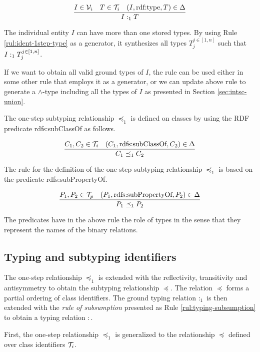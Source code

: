 \documentclass[runningheads]{llncs}
\newcommand{\V}{{\cal V}}
\newcommand{\T}{{\cal T}}
\begin{document}
\begin{equation}
\label{rul:ident-1step-type}
\dfrac{I\in\V_i\quad T\in\T_i\quad (I,\text{rdf:type},T)\in\D}
      {I :_1 T}
\end{equation}

The individual entity $I$ can have more than one stored types. By
using Rule \ref{rul:ident-1step-type} as a generator, it synthesizes
all types $T_j^{j\in[1,n]}$ such that $I:_1\/T_j^{j\in[1,n]}$.

If we want to obtain all valid ground types of $I$, the rule can be
used either in some other rule that employs it as a generator, or we
can update above rule to generate a $\land$-type including all the
types of $I$ as presented in Section \ref{sec:intsc-union}.

The one-step subtyping relationship $\preceq_1$ is defined on
classes by using the RDF predicate rdfs:sub\-ClassOf as follows.

\begin{equation}
\label{rul:ident-1step-subtype}
\dfrac{C_1,C_2\in\T_i \quad (C_1,\text{rdfs:subClassOf},C_2)\in\D}
{C_1 \preceq_1\/C_2}
\end{equation}

The rule for the definition of the one-step subtyping relationship
$\preceq_1$ is based on the predicate rdfs:subPropertyOf.

\begin{equation}
\dfrac{P_1,P_2\in\T_p \quad (P_1,\text{rdfs:subPropertyOf},P_2)\in\D}
      {P_1\preceq_1\/P_2}
\end{equation}

The predicates have in the above rule the role of types in the sense
that they represent the names of the binary relations. 



\subsection{Typing and subtyping identifiers\label{sec:idents-typing}}

The one-step relationship $\preceq_1$ is extended with the
reflectivity, transitivity and antisymmetry to obtain the subtyping
relationship $\preceq$. The relation $\preceq$ forms a partial ordering of
class identifiers. The ground typing relation $:_1$ is then
extended with the \emph{rule of subsumption} presented as Rule
\ref{rul:typing-subsumption} to obtain a typing relation $:$.

First, the one-step relationship $\preceq_1$ is generalized to the
relationship $\preceq$ defined over class identifiers $\T_i$.
\end{document}
